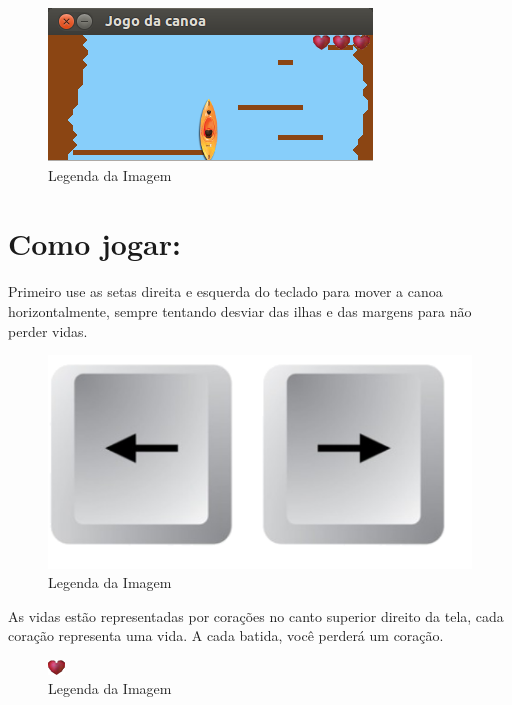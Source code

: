 \documentclass[a4paper,12pt]{article}
\begin{document}
    \bigskip

  \begin{figure}[h]
     \includegraphics[scale=1]{im2.png}
     \caption{Legenda da Imagem}
\end{figure}

\newpage %
 
\section{\textcolor{NavyBlue}{Como jogar: }}
  Primeiro use as setas direita e esquerda do teclado para mover a canoa 
  horizontalmente, sempre tentando desviar das ilhas e das margens para não perder
  vidas.

\begin{figure}[h]
     \includegraphics[scale=0.5]{setas.png}
     \caption{Legenda da Imagem}
\end{figure}

  As vidas estão representadas por corações no canto superior direito da tela, cada
  coração representa uma vida. A cada batida, você perderá um coração.
 
\begin{figure}[h]
     \includegraphics[scale=1]{heart.png}
     \caption{Legenda da Imagem}
\end{figure}
\end{document}

